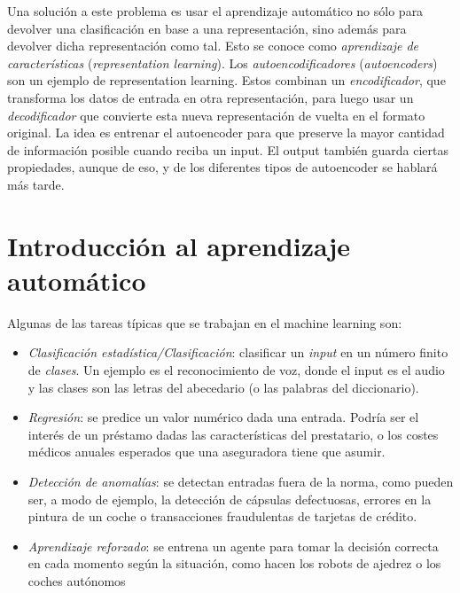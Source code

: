 \documentclass[a4paper, 12pt, oneside]{book}
\begin{document}
Una solución a este problema es usar el aprendizaje automático no sólo para devolver una 
clasificación en base a una representación, sino además para devolver dicha representación 
como tal. Esto se conoce como \textit{aprendizaje de características} (\textit{representation learning}).
Los \textit{autoencodificadores} (\textit{autoencoders}) son un ejemplo de representation learning.
Estos combinan un \textit{encodificador}, que transforma los datos de entrada en otra representación, para
luego usar un \textit{decodificador} que convierte esta nueva representación de vuelta en el formato
original. La idea es entrenar el autoencoder para que preserve la mayor cantidad de información
posible cuando reciba un input. El output también guarda ciertas propiedades, aunque de eso, y 
de los diferentes tipos de autoencoder se hablará más tarde.



\chapter{Introducción al aprendizaje automático}
\setcounter{page}{1} 

Algunas de las tareas típicas que se trabajan en el machine learning son:

\begin{itemize}
    \item \textit{Clasificación estadística/Clasificación}: clasificar un \textit{input} en un número finito de \textit{clases}.
    Un ejemplo es el reconocimiento de voz, donde el input es el audio y las clases son las 
    letras del abecedario (o las palabras del diccionario). 
    \item \textit{Regresión}: se predice un valor numérico dada una entrada. Podría ser 
    el interés de un préstamo dadas las características del prestatario, o los costes 
    médicos anuales esperados que una aseguradora tiene que asumir.
    \item \textit{Detección de anomalías}: se detectan entradas fuera de la norma, como pueden ser,
    a modo de ejemplo, la detección de cápsulas defectuosas, errores en la pintura de un coche o 
    transacciones fraudulentas de tarjetas de crédito.
    \item \textit{Aprendizaje reforzado}: se entrena un agente para tomar la decisión correcta
    en cada momento según la situación, como hacen los robots de ajedrez o los coches autónomos
\end{itemize}
\end{document}
